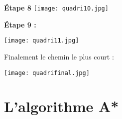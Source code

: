 \begin{multicols}{2}

\begin{center}

\textbf{\'Etape 8}
\texttt{[image: quadri10.jpg]}
\end{center}



\begin{center}
\textbf{\'Etape 9 :}

\texttt{[image: quadri11.jpg]}
\end{center}

\end{multicols}
Finalement le chemin le plus court :

\begin{center}
\texttt{[image: quadrifinal.jpg]}
\end{center}


\section{L'algorithme A*}

